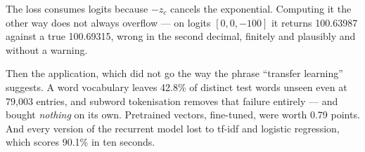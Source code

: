 \documentclass[11pt,a4paper]{article}
\begin{document}
The loss consumes logits because $-z_c$ cancels the exponential. Computing it
the other way does not always overflow --- on logits $[0,0,-100]$ it returns
100.63987 against a true 100.69315, wrong in the second decimal, finitely and
plausibly and without a warning.

Then the application, which did not go the way the phrase ``transfer learning''
suggests. A word vocabulary leaves 42.8\% of distinct test words unseen even at
79{,}003 entries, and subword tokenisation removes that failure entirely ---
and bought \emph{nothing} on its own. Pretrained vectors, fine-tuned, were
worth 0.79 points. And every version of the recurrent model lost to tf-idf and
logistic regression, which scores 90.1\% in ten seconds.
\end{document}
